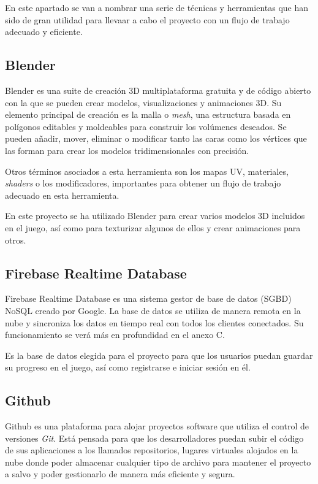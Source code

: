  \label{TecnicasYHerramientas}

En este apartado se van a nombrar una serie de técnicas y herramientas que han sido de gran utilidad para llevaar a cabo el proyecto con un flujo de trabajo adecuado y eficiente.

\subsection{Blender}
Blender\cite{wiki:Blender} es una suite de creación 3D multiplataforma gratuita y de código abierto con la que se pueden crear modelos, visualizaciones y animaciones 3D. Su elemento principal de creación es la malla o \textit{mesh}, una estructura basada en polígonos editables y moldeables para construir los volúmenes deseados. Se pueden añadir, mover, eliminar o modificar tanto las caras como los vértices que las forman para crear los modelos tridimensionales con precisión.

Otros términos asociados a esta herramienta son los mapas UV, materiales, \textit{shaders} o los modificadores, importantes para obtener un flujo de trabajo adecuado en esta herramienta.

En este proyecto se ha utilizado Blender para crear varios modelos 3D incluidos en el juego, así como para texturizar algunos de ellos y crear animaciones para otros.

\subsection{Firebase Realtime Database}
Firebase Realtime Database \cite{wiki:Firebase} es una sistema gestor de base de datos (SGBD) NoSQL creado por Google. La base de datos se utiliza de manera remota en la nube y sincroniza los datos en tiempo real con todos los clientes conectados. Su funcionamiento se verá más en profundidad en el anexo C.

Es la base de datos elegida para el proyecto para que los usuarios puedan guardar su progreso en el juego, así como registrarse e iniciar sesión en él. 

\subsection{Github}
Github \cite{wiki:Github} es una plataforma para alojar proyectos software que utiliza el control de versiones \textit{Git}. Está pensada para que los desarrolladores puedan subir el código de sus aplicaciones a los llamados repositorios, lugares virtuales alojados en la nube donde poder almacenar cualquier tipo de archivo para mantener el proyecto a salvo y poder gestionarlo de manera más eficiente y segura.

